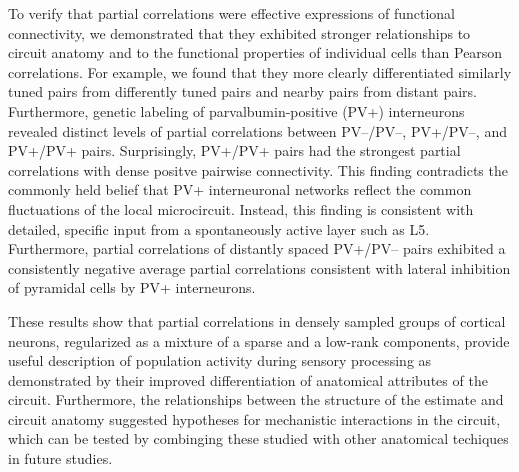 To verify that partial correlations were effective expressions of functional connectivity, we demonstrated that they exhibited stronger relationships to circuit anatomy and to the functional properties of individual cells than Pearson correlations. 
For example, we found that they more clearly differentiated similarly tuned pairs from differently tuned pairs and nearby pairs from distant pairs.  
Furthermore, genetic labeling of parvalbumin-positive (PV+) interneurons revealed distinct levels of  partial correlations between PV--/PV--, PV+/PV--, and PV+/PV+ pairs. 
Surprisingly, PV+/PV+ pairs had the strongest partial correlations with dense positve pairwise connectivity. 
This finding contradicts the commonly held belief that PV+ interneuronal networks reflect  the common fluctuations of the local microcircuit. Instead, this finding is consistent with detailed, specific input from a spontaneously active layer such as L5.
Furthermore, partial correlations of distantly spaced PV+/PV-- pairs exhibited a consistently negative average partial correlations consistent with lateral inhibition of pyramidal cells by PV+ interneurons. 

These results show that partial correlations in densely sampled groups of cortical neurons, regularized as a mixture of a sparse and a low-rank components, provide useful description of population activity during sensory processing as demonstrated by their improved differentiation of anatomical attributes of the circuit.  Furthermore, the relationships between the structure of the estimate and circuit anatomy suggested hypotheses for mechanistic interactions in the circuit, which can be tested by combinging these studied with other anatomical techiques in future studies.
